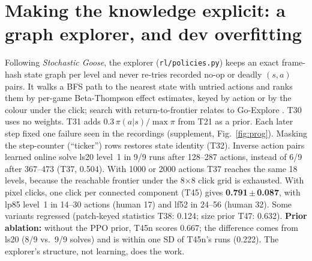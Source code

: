 \documentclass[10pt]{article}
\newcommand{\Tn}[1]{T#1\xspace}
\begin{document}
\begin{table}[t]
\centering\scriptsize\setlength{\tabcolsep}{3pt}
\caption{Master results. Local official scores (0--100 scale; our harness, offline) on train/dev/held-out, plus the Kaggle public leaderboard (hidden games, a single run). Dev: mean\,$\pm$\,SD over training seeds; for the training-free \Tn{30}, \Tn{35n} and \Tn{45n}, SD over 9 evaluation seeds (random: 3). Lv: levels over all dev runs (of 342; random of 114). Level~1: solving runs @ actions taken; no agent finished a game, so every run used all 500 actions. Train: 3 eval seeds (learned agents: training seed 0, on their own training games). Held-out: same runs as dev, evaluated once. --: not run or not submitted. $^\dagger$Starter random agent.}
\label{tab:master}
\resizebox{\textwidth}{!}{}
\end{table}

\section{Making the knowledge explicit: a graph explorer, and dev overfitting}
\label{sec:graph}
Following \emph{Stochastic Goose}, the explorer (\texttt{rl/policies.py}) keeps an exact frame-hash state graph per level and never re-tries recorded no-op or deadly $(s,a)$ pairs. It walks a BFS path to the nearest state with untried actions and ranks them by per-game Beta-Thompson \citep{thompson1933} effect estimates, keyed by action or by the colour under the click; search with return-to-frontier relates to Go-Explore \citep{ecoffet2021}. \Tn{30} uses no weights. \Tn{31} adds $0.3\,\pi(a|s)/\max\pi$ from \Tn{21} as a prior. Each later step fixed one failure seen in the recordings (supplement, Fig.~\ref{fig:prog}). Masking the step-counter (``ticker'') rows restores state identity (\Tn{32}). Inverse action pairs learned online solve ls20 level~1 in 9/9 runs after 128--287 actions, instead of 6/9 after 367--473 (\Tn{37}, 0.504). With 1000 or 2000 actions \Tn{37} reaches the same 18 levels, because the reachable frontier under the 8$\times$8 click grid is exhausted. With pixel clicks, one click per connected component (\Tn{45}) gives \textbf{0.791\,$\pm$\,0.087}, with lp85 level~1 in 14--30 actions (human 17) and lf52 in 24--56 (human 32). Some variants regressed (patch-keyed statistics \Tn{38}: 0.124; size prior \Tn{47}: 0.632). \textbf{Prior ablation:} without the PPO prior, \Tn{45n} scores 0.667; the difference comes from ls20 (8/9 vs.\ 9/9 solves) and is within one SD of \Tn{45n}'s runs (0.222). The explorer's structure, not learning, does the work.
\end{document}
